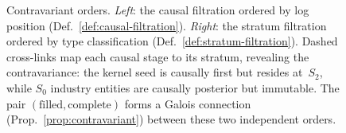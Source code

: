 \begin{figure}[t]
\caption{Contravariant orders. \emph{Left}: the causal filtration ordered by
log position (Def.~\ref{def:causal-filtration}). \emph{Right}: the stratum
filtration ordered by type classification (Def.~\ref{def:stratum-filtration}).
Dashed cross-links map each causal stage to its stratum, revealing the
contravariance: the kernel seed is causally first but resides at~$S_2$, while
$S_0$ industry entities are causally posterior but immutable. The pair
$(\mathrm{filled}, \mathrm{complete})$ forms a Galois connection
(Prop.~\ref{prop:contravariant}) between these two independent orders.}
\label{fig:filtration}
\end{figure}
